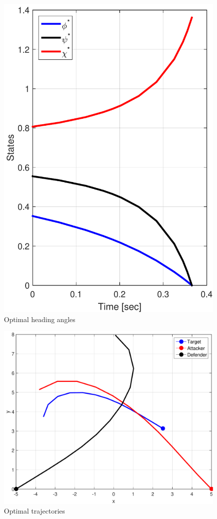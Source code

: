 \begin{figure}[H]
	\centering
	\includegraphics[scale = 0.5]{fig/fig7b_paper.pdf}
	\caption{Optimal heading angles}
\end{figure}


\begin{figure}[H]
	\centering
	\includegraphics[scale = 0.7]{fig/fig8_paper_numerical.pdf}
	\caption{Optimal trajectories}
	\label{Optimal trajectories}
\end{figure}